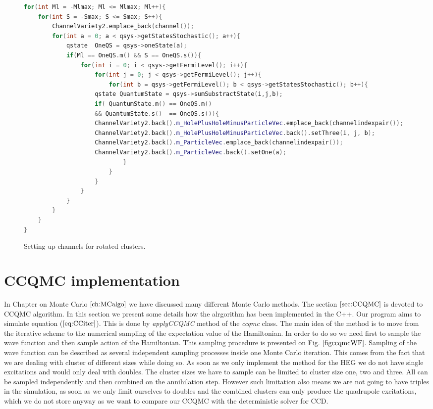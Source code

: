 \documentclass[twoside,english]{uiofysmaster}
\theoremstyle{definition}
\begin{document}
\begin{figure}
	\begin{lstlisting}[language=C++]
for(int Ml = -Mlmax; Ml <= Mlmax; Ml++){
   	for(int S = -Smax; S <= Smax; S++){
   		ChannelVariety2.emplace_back(channel());
   		for(int a = 0; a < qsys->getStatesStochastic(); a++){
   			qstate  OneQS = qsys->oneState(a);
   			if(Ml == OneQS.m() && S == OneQS.s()){
   				for(int i = 0; i < qsys->getFermiLevel(); i++){
   					for(int j = 0; j < qsys->getFermiLevel(); j++){
  						for(int b = qsys->getFermiLevel(); b < qsys->getStatesStochastic(); b++){
					qstate QuantumState = qsys->sumSubstractState(i,j,b);
					if( QuantumState.m() == OneQS.m()
					&& QuantumState.s()  == OneQS.s()){
					ChannelVariety2.back().m_HolePlusHoleMinusParticleVec.emplace_back(channelindexpair());
					ChannelVariety2.back().m_HolePlusHoleMinusParticleVec.back().setThree(i, j, b);
					ChannelVariety2.back().m_ParticleVec.emplace_back(channelindexpair());
					ChannelVariety2.back().m_ParticleVec.back().setOne(a);
  							}
   						}
   					}
   				}
   			}
   		}
   	}
}
\end{lstlisting}
\caption{Setting up channels for rotated clusters.} \label{f:vectors_for_Q4}
\end{figure}

\section{CCQMC implementation} \label{sec:CCQMCimpl}
In Chapter on Monte Carlo $\ref{ch:MCalgo}$ we have discussed many different Monte Carlo methods. The section $\ref{sec:CCQMC}$ is devoted to CCQMC algorithm. In this section we present some details how the alrgorithm has been implemented in the C++. Our program aims to simulate equation ($\ref{eq:CCiter}$). This is done by \textit{applyCCQMC} method of the \textit{ccqmc} class. The main idea of the method is to move from the iterative scheme to the numerical sampling of the expectation value of the Hamiltonian. In order to do so we need first to sample the wave function and then sample action of the Hamiltonian. This sampling procedure is presented on Fig. $\ref{figccqmcWF}$. Sampling of the wave function can be described as several independent sampling processes inside one Monte Carlo iteration. This comes from the fact that we are dealing with cluster of different sizes while doing so. As soon as we only implement the method for the HEG we do not have single excitations and would only deal with doubles. The cluster sizes we have to sample can be limited to cluster size one, two and three. All can be sampled independently and then combined on the annihilation step. However such limitation also means we are not going to have triples in the simulation, as soon as we only limit ourselves to doubles and the combined clusters can only produce the quadrupole excitations, which we do not store anyway as we want to compare our CCQMC with the deterministic solver for CCD. \\
\end{document}
